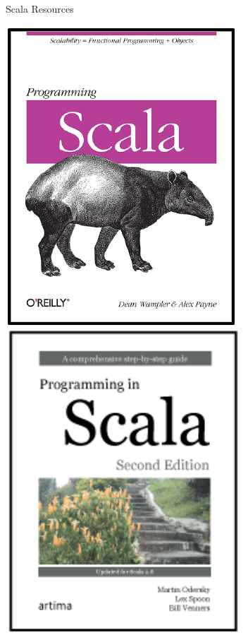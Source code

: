 \documentclass[xcolor=pdflatex,dvipsnames,table]{beamer}
\begin{document}
\begin{frame}{Scala Resources}

\begin{center}
\includegraphics[height=0.4\textheight]{../bootcamp/figs/programming-scala.pdf} \\
\includegraphics[height=0.4\textheight]{../bootcamp/figs/programming-in-scala.pdf}
\end{center}

\end{frame}
\end{document}

